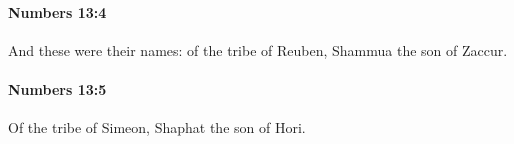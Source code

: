		\paragraph{Numbers 13:4} %
			\label{NUMBERS-13-4}

			And these were their names: of the tribe of Reuben, Shammua the son of Zaccur.


		\paragraph{Numbers 13:5} %
			\label{NUMBERS-13-5}

			Of the tribe of Simeon, Shaphat the son of Hori.



